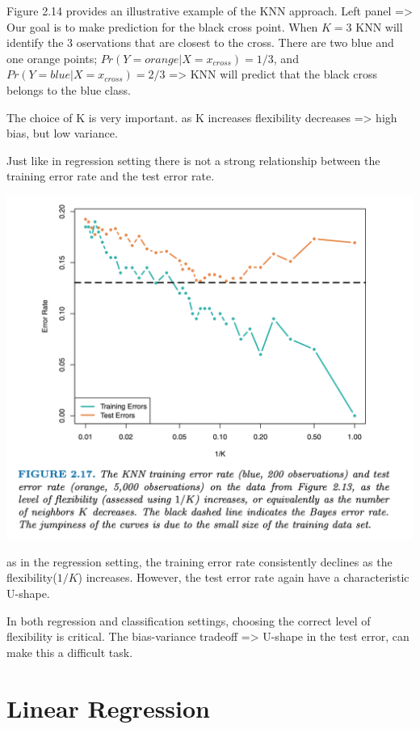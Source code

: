 \documentclass[
  letterpaper,
  DIV=11,
  numbers=noendperiod]{scrreprt}
\begin{document}
Figure 2.14 provides an illustrative example of the KNN approach. Left
panel =\textgreater{} Our goal is to make prediction for the black cross
point. When \(K=3\) KNN will identify the 3 oservations that are closest
to the cross. There are two blue and one orange points;
\(Pr(Y=orange | X = x_{cross}) = 1/3\), and
\(Pr(Y=blue | X = x_{cross}) = 2/3\) =\textgreater{} KNN will predict
that the black cross belongs to the blue class.

The choice of K is very important. as K increases flexibility decreases
=\textgreater{} high bias, but low variance.

Just like in regression setting there is not a strong relationship
between the training error rate and the test error rate.

\includegraphics{fig2.17.png}

as in the regression setting, the training error rate consistently
declines as the flexibility(\(1/K\)) increases. However, the test error
rate again have a characteristic U-shape.

In both regression and classification settings, choosing the correct
level of flexibility is critical. The bias-variance tradeoff
=\textgreater{} U-shape in the test error, can make this a difficult
task.


\hypertarget{linear-regression}{%
\chapter{Linear Regression}\label{linear-regression}}
\end{document}
